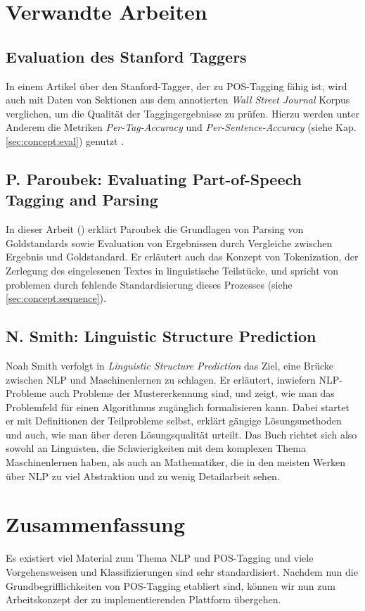 \section{Verwandte Arbeiten}
\label{sec:related:r}

\subsection{Evaluation des Stanford Taggers}
\label{sec:related:r:stanford}
In einem Artikel über den Stanford-Tagger, der zu POS-Tagging fähig ist, wird auch mit Daten von Sektionen aus dem annotierten \textit{Wall Street Journal} Korpus verglichen, um die Qualität der Taggingergebnisse zu prüfen. Hierzu werden unter Anderem die Metriken \textit{Per-Tag-Accuracy} und \textit{Per-Sentence-Accuracy} (siehe Kap. \ref{sec:concept:eval}) genutzt \cite{Paper:StanfordTagger}.

\subsection{P. Paroubek: Evaluating Part-of-Speech Tagging and Parsing}

In dieser Arbeit (\cite{paroubek}) erklärt Paroubek die Grundlagen von Parsing von Goldstandards sowie Evaluation von Ergebnissen durch Vergleiche zwischen Ergebnis und Goldstandard. Er erläutert auch das Konzept von Tokenization, der Zerlegung des eingelesenen Textes in linguistische Teilstücke, und spricht von problemen durch fehlende Standardisierung dieses Prozesses (siehe \ref{sec:concept:sequence}).

\subsection{N. Smith: Linguistic Structure Prediction}

Noah Smith verfolgt in \textit{Linguistic Structure Prediction} \cite{Smith} das Ziel, eine Brücke zwischen NLP und Maschinenlernen zu schlagen. Er erläutert, inwiefern NLP-Probleme auch Probleme der Mustererkennung sind, und zeigt, wie man das Problemfeld für einen Algorithmus zugänglich formalisieren kann. Dabei startet er mit Definitionen der Teilprobleme selbst, erklärt gängige Lösungsmethoden und auch, wie man über deren Lösungsqualität urteilt. Das Buch richtet sich also sowohl an Linguisten, die Schwierigkeiten mit dem komplexen Thema Maschinenlernen haben, als auch an Mathematiker, die in den meisten Werken über NLP zu viel Abstraktion und zu wenig Detailarbeit sehen.



\section{Zusammenfassung}
\label{sec:related:conclusion}

Es existiert viel Material zum Thema NLP und POS-Tagging und viele Vorgehensweisen und Klassifizierungen sind sehr standardisiert. Nachdem nun die Grundbegrifflichkeiten von POS-Tagging etabliert sind, können wir nun zum Arbeitskonzept der zu implementierenden Plattform übergehen.

